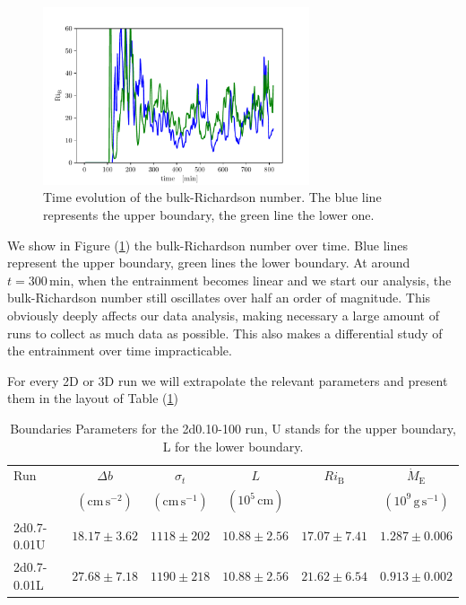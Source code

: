 \begin{figure}[t!]
\centering
\includegraphics[width=0.7\textwidth]{./img/bulk.pdf}
\caption{Time evolution of the bulk-Richardson number. The blue line represents the upper boundary, the green line the lower one.}
\label{fig:bulk}
\centering
\end{figure}
We show in Figure (\ref{fig:bulk}) the bulk-Richardson number over time. Blue lines represent the upper boundary, green lines the lower boundary. At around $t=\mathrm{300 \, min}$, when the entrainment becomes linear and we start our analysis, the bulk-Richardson number still oscillates over half an order of magnitude. This obviously deeply affects our data analysis, making necessary a large amount of runs to collect as much data as possible. This also makes a differential study of the entrainment over time impracticable. 

For every 2D or 3D run we will extrapolate the relevant parameters and present them in the layout of Table (\ref{2dsingletab})
 \begin{table}\caption{Boundaries Parameters for the 2d0.10-100 run, U stands for the upper boundary, L for the lower boundary.}
 \begin{tabular}{lccccc}
	 \toprule
	 Run &$\Delta b  $&$\sigma_t$ & $L$&$Ri_{\mathrm{B}}$&$\dot{M}_{\mathrm{E}}$ \\
		    & $(\mathrm{cm \, s^{-2}})$&$(\mathrm{cm \, s^{-1}})$&$(10^5 \, \mathrm{cm})$ & & $(10^9 \, \mathrm{g \, s^{-1}})$ \\
	  	\midrule
		2d0.7-0.01U&$ 18.17 \pm 3.62 $&$1118 \pm 202 $ &  $10.88 \pm 2.56 $ & $17.07 \pm 7.41 $ & $1.287 \pm 0.006$\\
		2d0.7-0.01L &$27.68 \pm 7.18$&$1190 \pm 218$ & $10.88 \pm 2.56$ &  $21.62 \pm 6.54$ & $0.913 \pm 0.002$\\
		\bottomrule
	\end{tabular}\label{2dsingletab}
 \end{table}

